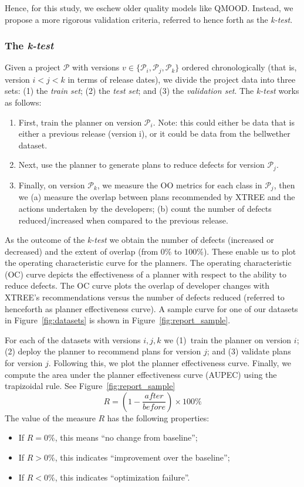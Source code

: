 \documentclass[10pt,journal,compsoc]{IEEEtran}
\newcommand{\bi}{\begin{itemize}} %
\newcommand{\ei}{\end{itemize}}
\newcommand{\be}{\begin{enumerate}}
\newcommand{\ee}{\end{enumerate}}
\newcommand{\fig}[1]{Figure~\ref{fig:#1}}
\begin{document}
Hence, for this study, we  eschew
older quality models like QMOOD. Instead, we propose a more rigorous validation criteria, referred to hence forth as the \textit{k-test}.


\subsubsection{The \textit{k-test}}

Given a project $\mathcal{P}$ with versions $v\in\{\mathcal{P}_i, \mathcal{P}_j, \mathcal{P}_k\}$ ordered chronologically (that is, version $i<j<k$ in terms of release dates), we divide the project data  into three sets: (1) the \textit{train set}; (2) the \textit{test set}; and (3) the \textit{validation set}. The \textit{k-test} works as follows:
\be
\item First, train the planner on version $\mathcal{P}_i$. Note: this could either be data that is either a previous release (version i), or it could be data from the bellwether dataset. 
\item Next, use the planner to generate plans to reduce defects for version $\mathcal{P}_j$.
\item Finally, on version  $\mathcal{P}_k$, we measure the OO metrics for each class in $\mathcal{P}_j$, then we (a) measure the overlap between plans recommended by XTREE and the actions undertaken by the developers; (b) count the number of defects reduced/increased when compared to the previous release.
\ee



As the outcome of the \textit{k-test} we obtain the number of defects (increased or decreased) and the extent of overlap (from 0\% to 100\%). These enable us to plot the operating characteristic curve for the planners. The operating characteristic (OC) curve depicts the effectiveness of a planner with respect to the ability to reduce defects. The OC curve plots the overlap of developer changes with XTREE's recommendations versus the number of  defects reduced (referred to henceforth as planner effectiveness curve). A sample curve for one of our datasets in \fig{datasets} is shown in \fig{report_sample}.

For each of the datasets with versions $i, j, k$ we (1)~train the planner on version $i$; (2) deploy the planner to recommend plans for version $j$; and (3) validate plans for version $j$. Following this, we plot the planner effectiveness curve. Finally, we compute the area under the planner effectiveness curve (AUPEC) using the trapizoidal rule. See \fig{report_sample}
\begin{equation}
	\label{eq:diff}
	R=(1-\frac{\mathit{after}}{\mathit{before}})\times100\%
\end{equation}
The value of the measure $R$ has the following properties:
\bi
\item If $R = 0\%$, this means  ``no change from baseline''; 
\item If $R > 0\%$, this indicates ``improvement over the baseline'';
\item If $R < 0\%$, this indicates ``optimization failure''.
\ei
\end{document}
